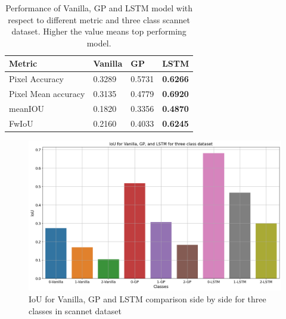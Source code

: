	\begin{table}[h]
		\begin{center}
			\begin{tabular}{ | l | l | l | p{4cm} |}
				\hline
				
				\cellcolor{purple!30}Metric & \cellcolor{purple!30}Vanilla & \cellcolor{purple!30}GP & \cellcolor{purple!30}LSTM\\ \hline
				Pixel Accuracy & 0.3289 & 0.5731 & {\bf 0.6266} \\ \hline
				Pixel Mean accuracy & 0.3135 & 0.4779 & {\bf 0.6920} \\ \hline
				meanIOU & 0.1820 & 0.3356 & {\bf 0.4870} \\ \hline
				FwIoU & 0.2160 & 0.4033 & {\bf 0.6245} \\ \hline
				\hline
			\end{tabular}
			\caption{Performance of Vanilla, GP and LSTM model with respect to different metric and three class scannet dataset. Higher the value means top performing model.}
			\label{table:unet_scannet_three_classes}
		\end{center}
	\end{table}	

	\begin{figure}
		\centering
		\includegraphics[width=12cm]{images/IoU_v_g_l_three_classes.png}
		\caption{IoU for Vanilla, GP and LSTM comparison side by side for three classes in scannet dataset}
		\label{fig:performance_metric_three_classes_unet}
	\end{figure}
	

